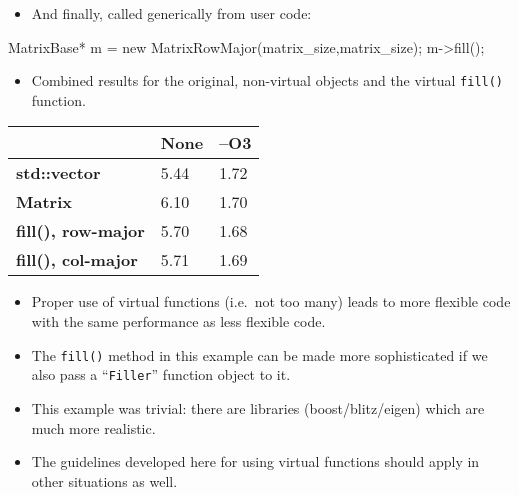 \begin{frame}[fragile]
  \begin{itemize}
  \item {And finally, called generically from user code:}
  \end{itemize}
\small
  \begin{semiverbatim}
MatrixBase* m = 
  new MatrixRowMajor(matrix_size,matrix_size);
m->fill();
  \end{semiverbatim}
\end{frame}





\begin{frame}
  \begin{itemize}
  \item {Combined results for the original, non-virtual objects and the
      virtual \texttt{fill()} function.}
  \end{itemize}
  \begin{center}
  \begin{tabular}{lll} \toprule
                     & \textbf{None} & \textbf{--O3} \\ \midrule
    \textbf{std::vector}            & 5.44 & 1.72  \\ 
    \textbf{Matrix}                 & 6.10 & 1.70  \\ 
    \textbf{fill(), row-major }     & 5.70 & 1.68  \\ 
    \textbf{fill(), col-major }     & 5.71 & 1.69  \\ \bottomrule
  \end{tabular}
  \end{center}
\end{frame}


\begin{frame}
  \begin{itemize}
    \itemsep=.65cm
  \item {Proper use of virtual functions (i.e.\ not too many) leads to
    more flexible code with the same performance as less flexible code.}

  \item {The \texttt{fill()} method in this example can be made more sophisticated
      if we also pass a ``\texttt{Filler}'' function object to it. }

  \item {This example was trivial: there are libraries
      (boost/blitz/eigen) which are much more realistic.}

  \item{The guidelines developed here for using virtual functions should
    apply in other situations as well.}

  \end{itemize}
\end{frame}

